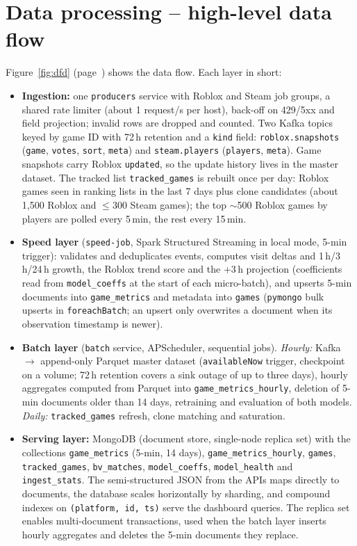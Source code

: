 \documentclass[10pt,a4paper]{article}
\newcommand{\ep}[1]{\texttt{\small #1}}
\begin{document}
\section{Data processing -- high-level data flow}
Figure~\ref{fig:dfd} (page~\pageref{fig:dfd}) shows the data flow. Each layer in short:
\begin{itemize}
  \item \textbf{Ingestion:} one \ep{producers} service with Roblox and Steam job groups, a shared rate limiter (about 1 request/s per host), back-off on 429/5xx and field projection; invalid rows are dropped and counted. Two Kafka topics keyed by game ID with 72\,h retention and a \ep{kind} field: \ep{roblox.snapshots} (\ep{game}, \ep{votes}, \ep{sort}, \ep{meta}) and \ep{steam.players} (\ep{players}, \ep{meta}). Game snapshots carry Roblox \ep{updated}, so the update history lives in the master dataset. The tracked list \ep{tracked\_games} is rebuilt once per day: Roblox games seen in ranking lists in the last 7 days plus clone candidates (about 1,500 Roblox and $\le$300 Steam games); the top $\sim$500 Roblox games by players are polled every 5\,min, the rest every 15\,min.
  \item \textbf{Speed layer} (\ep{speed-job}, Spark Structured Streaming in local mode, 5-min trigger): validates and deduplicates events, computes visit deltas and 1\,h/3\,h/24\,h growth, the Roblox trend score and the +3\,h projection (coefficients read from \ep{model\_coeffs} at the start of each micro-batch), and upserts 5-min documents into \ep{game\_metrics} and metadata into \ep{games} (\ep{pymongo} bulk upserts in \ep{foreachBatch}; an upsert only overwrites a document when its observation timestamp is newer).
  \item \textbf{Batch layer} (\ep{batch} service, APScheduler, sequential jobs). \emph{Hourly:} Kafka $\rightarrow$ append-only Parquet master dataset (\ep{availableNow} trigger, checkpoint on a volume; 72\,h retention covers a sink outage of up to three days), hourly aggregates computed from Parquet into \ep{game\_metrics\_hourly}, deletion of 5-min documents older than 14 days, retraining and evaluation of both models. \emph{Daily:} \ep{tracked\_games} refresh, clone matching and saturation.
  \item \textbf{Serving layer:} MongoDB (document store, single-node replica set) with the collections \ep{game\_metrics} (5-min, 14 days), \ep{game\_metrics\_hourly}, \ep{games}, \ep{tracked\_games}, \ep{bv\_matches}, \ep{model\_coeffs}, \ep{model\_health} and \ep{ingest\_stats}. The semi-structured JSON from the APIs maps directly to documents, the database scales horizontally by sharding, and compound indexes on \ep{(platform, id, ts)} serve the dashboard queries. The replica set enables multi-document transactions, used when the batch layer inserts hourly aggregates and deletes the 5-min documents they replace.
\end{itemize}
\end{document}
